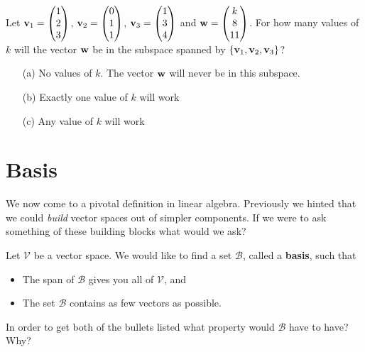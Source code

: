 \begin{problem}
    Let ${\bf v}_1 = \begin{pmatrix} 1 \\ 2 \\ 3 \end{pmatrix}$, ${\bf v}_2 = \begin{pmatrix} 0 \\
        1 \\ 1 \end{pmatrix}$, ${\bf v}_3 = \begin{pmatrix} 1 \\ 3 \\ 4 \end{pmatrix}$ and
            ${\bf w} = \begin{pmatrix} k \\ 8 \\ 11\end{pmatrix}$.  For how many values of $k$
                will the vector ${\bf w}$ be in the subspace spanned by
                $\{{\bf v}_1,{\bf v}_2,{\bf v}_3\}$?
    \begin{enumerate}
        \item[(a)] No values of $k$.  The vector ${\bf w}$ will never be in this subspace.
        \item[(b)] Exactly one value of $k$ will work
        \item[(c)] Any value of $k$ will work
    \end{enumerate}
\end{problem}

%         


\section{Basis}
We now come to a pivotal definition in linear algebra.  Previously we hinted that we
could {\it build} vector spaces out of simpler components.  If we were to ask something of
these building blocks what would we ask?
\begin{problem}
    Let $\mathcal{V}$ be a vector space.  We would like to find a set $\mathcal{B}$,
    called a {\bf basis}, such that
    \begin{itemize}
        \item The span of $\mathcal{B}$ gives you all of $\mathcal{V}$, and 
        \item The set $\mathcal{B}$ contains as few vectors as possible.
    \end{itemize}
    In order to get both of the bullets listed what property would $\mathcal{B}$ have to
    have?  Why?
\end{problem}


